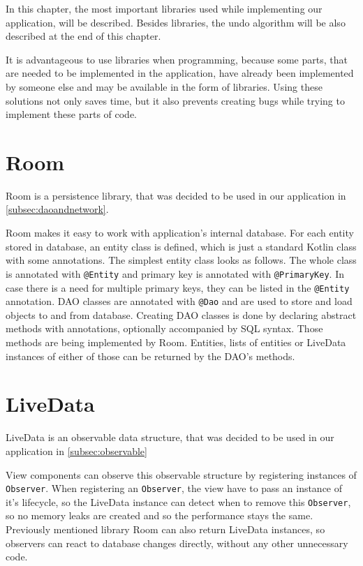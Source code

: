 In this chapter, the most important libraries used while implementing our application, will be described.
Besides libraries, the undo algorithm will be also described at the end of this chapter.

It is advantageous to use libraries when programming, because some parts, that are needed to be implemented in the application, have already been implemented by someone else and may be available in the form of libraries.
Using these solutions not only saves time, but it also prevents creating bugs while trying to implement these parts of code.

\section{Room}
Room is a persistence library, that was decided to be used in our application in \autoref{subsec:daoandnetwork}.

Room makes it easy to work with application's internal database.
For each entity stored in database, an entity class is defined, which is just a standard Kotlin class with some annotations.
The simplest entity class looks as follows.
The whole class is annotated with \verb|@Entity| and primary key is annotated with \verb|@PrimaryKey|.
In case there is a need for multiple primary keys, they can be listed in the \verb|@Entity| annotation.
DAO classes are annotated with \verb|@Dao| and are used to store and load objects to and from database.
Creating DAO classes is done by declaring abstract methods with annotations, optionally accompanied by SQL syntax.
Those methods are being implemented by Room.
Entities, lists of entities or LiveData instances of either of those can be returned by the DAO's methods.

\section{LiveData}
LiveData is an observable data structure, that was decided to be used in our application in \autoref{subsec:observable}

View components can observe this observable structure by registering instances of \verb|Observer|.
When registering an \verb|Observer|, the view have to pass an instance of it's lifecycle, so the LiveData instance can detect when to remove this \verb|Observer|, so no memory leaks are created and so the performance stays the same.
Previously mentioned library Room can also return LiveData instances, so observers can react to database changes directly, without any other unnecessary code.

